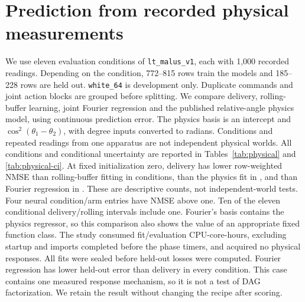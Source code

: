 \section{Prediction from recorded physical measurements}
\label{sec:physical}
We use eleven evaluation conditions of \texttt{lt\_malus\_v1}, each with
1,000 recorded readings. Depending on the condition, 772--815 rows train the
models and 185--228 rows are held out. \texttt{white\_64} is development only. Duplicate commands and joint action
blocks are grouped before splitting. We compare delivery, rolling-buffer learning,
joint Fourier regression and the published relative-angle physics model, using
continuous prediction error. The physics basis is an intercept and
$\cos^2(\theta_1-\theta_2)$, with degree inputs converted to radians. Conditions and repeated
readings from one apparatus are not independent physical worlds. All conditions
and conditional uncertainty are reported in Tables~\ref{tab:physical} and
\ref{tab:physical-ci}. At fixed initialization zero, delivery has lower
row-weighted NMSE than rolling-buffer fitting in \CRollingWins{} conditions,
than the physics fit in \CPhysicsWins{}, and than Fourier regression in
\CFourierWins{}. These are descriptive counts, not independent-world tests. Four neural
condition/arm entries have NMSE above one. Ten of the eleven
conditional delivery/rolling intervals include one. Fourier's basis contains
the physics regressor, so this comparison also shows the value of an appropriate
fixed function class.
The study consumed \CCPU{} fit/evaluation CPU-core-hours, excluding startup
and imports completed before the phase timers, and acquired no physical responses. All fits were sealed before
held-out losses were computed. Fourier regression has lower held-out error than delivery in every condition. This case contains one
measured response mechanism, so it is not a test of DAG factorization. We retain
the result without changing the recipe after scoring.

